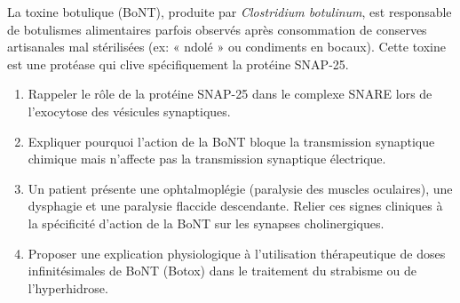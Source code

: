 \documentclass[11pt]{article}
\begin{document}
\begin{exercice}
La toxine botulique (BoNT), produite par \textit{Clostridium botulinum}, est responsable de botulismes alimentaires parfois observés après consommation de conserves artisanales mal stérilisées (ex: « ndolé » ou condiments en bocaux). Cette toxine est une protéase qui clive spécifiquement la protéine SNAP-25.

\begin{enumerate}
    \item Rappeler le rôle de la protéine SNAP-25 dans le complexe SNARE lors de l'exocytose des vésicules synaptiques.
    \item Expliquer pourquoi l'action de la BoNT bloque la transmission synaptique chimique mais n'affecte pas la transmission synaptique électrique.
    \item Un patient présente une ophtalmoplégie (paralysie des muscles oculaires), une dysphagie et une paralysie flaccide descendante. Relier ces signes cliniques à la spécificité d'action de la BoNT sur les synapses cholinergiques.
    \item Proposer une explication physiologique à l'utilisation thérapeutique de doses infinitésimales de BoNT (Botox\textregistered) dans le traitement du strabisme ou de l'hyperhidrose.
\end{enumerate}
\end{exercice}
\end{document}

